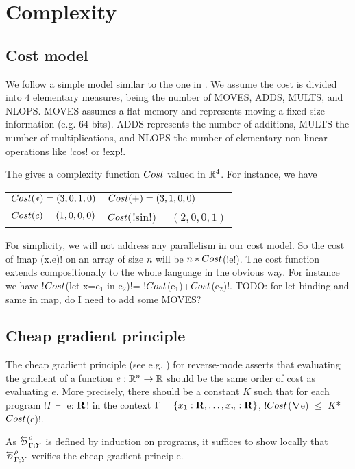 \section{Complexity}
\label{sec:complexity}

\subsection{Cost model}
\label{sub:costModel}

We follow a simple model similar to the one in \cite{griewank2008evaluating}.
We assume the cost is divided into $4$ elementary measures, being the number of MOVES, ADDS, MULTS, and NLOPS.
MOVES assumes a flat memory and represents moving a fixed size information  (e.g. 64 bits). 
ADDS represents the number of additions, 
MULTS the number of multiplications, 
and NLOPS the number of elementary non-linear operations like !cos! or !exp!.

The gives a complexity function $Cost$ valued in $\mathbb{R}^4$. 
For instance, we have 

\begin{tabular}{ll}
    $Cost(*)=(3,0,1,0)$ & $Cost(+)=(3,1,0,0)$\\
    $Cost(c)=(1,0,0,0)$ & $Cost($!sin!$)=(2,0,0,1)$
\end{tabular}

For simplicity, we will not address any parallelism in our cost model. 
So the cost of !map (x.e)! on an array of size $n$ will be $n*Cost$(!e!).
The cost function extends compositionally to the whole language in the obvious way.
For instance we have !$Cost$(let x=e$_1$ in e$_2$)!= !$Cost$(e$_1$)+$Cost$(e$_2$)!.
TODO: for let binding and same in map, do I need to add some MOVES?

\subsection{Cheap gradient principle}

The cheap gradient principle (see e.g. \cite{griewank2008evaluating}) for reverse-mode
asserts that evaluating the gradient of a function $e:\mathbb{R}^n\to\mathbb{R}$ 
should be the same order of cost as evaluating $e$. 
More precisely, there should be a constant $K$ such that for each program !$\Gamma \vdash$ e: $\mathbf{R}$! in the context $\Gamma=\{x_1:\mathbf{R},\ldots,x_n:\mathbf{R}\}$,
 !$Cost$($\nabla$e) $\leq$ $K$*$Cost$(e)!.

As $\directD{\rho}{\Gamma}{Y}$ is defined by induction on programs, it suffices to show locally 
that $\directD{\rho}{\Gamma}{Y}$ verifies the cheap gradient principle. 

